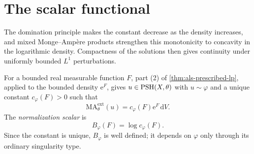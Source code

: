 \section{The scalar functional}\label{sec:normalization-scalar}

The domination principle makes the constant decrease as the density increases, and mixed Monge--Amp\`ere products strengthen this monotonicity to concavity in the logarithmic density. Compactness of the solutions then gives continuity under uniformly bounded $L^1$ perturbations.

For a bounded real measurable function $F$, part (2) of \cref{thm:als-prescribed-lp}, applied to the bounded density $\mathrm{e}^F$, gives $u\in\mathrm{PSH}(X,\theta)$ with $u\sim\varphi$ and a unique constant $c_\varphi(F)>0$ such that
\begin{equation}\label{eq:relative-normalization}
 \mathrm{MA}^{\mathrm{ext}}_\theta(u)
       =c_\varphi(F)\mathrm{e}^F\,\mathrm{d}V.
\end{equation}
The \emph{normalization scalar} is
\[
 B_\varphi(F)=\log c_\varphi(F).
\]
Since the constant is unique, $B_\varphi$ is well defined; it depends on $\varphi$ only through its ordinary singularity type.

